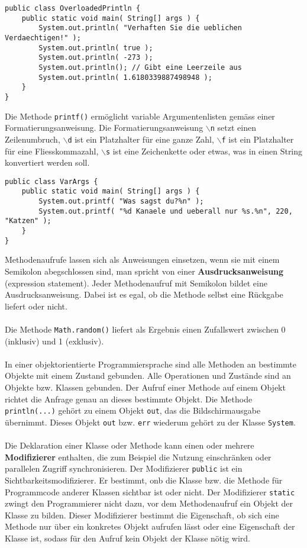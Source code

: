 \begin{lstlisting}
public class OverloadedPrintln {
    public static void main( String[] args ) {
        System.out.println( "Verhaften Sie die ueblichen Verdaechtigen!" );
        System.out.println( true );
        System.out.println( -273 );
        System.out.println(); // Gibt eine Leerzeile aus
        System.out.println( 1.6180339887498948 );
    }
}
\end{lstlisting}
Die Methode \texttt{printf()} ermöglicht variable Argumentenlisten gemäss einer Formatierungsanweisung. Die Formatierungsanweisung \texttt{$\backslash$n} setzt einen Zeilenumbruch, \texttt{$\backslash$d} ist ein Platzhalter für eine ganze Zahl, \texttt{$\backslash$f} ist ein Platzhalter für eine Fliesskommazahl, \texttt{$\backslash$s} ist eine Zeichenkette oder etwas, was in einen String konvertiert werden soll.
\begin{lstlisting}
public class VarArgs {
    public static void main( String[] args ) {
        System.out.printf( "Was sagst du?%n" );
        System.out.printf( "%d Kanaele und ueberall nur %s.%n", 220, "Katzen" );
    }
}
\end{lstlisting}
Methodenaufrufe lassen sich als Anweisungen einsetzen, wenn sie mit einem Semikolon abegschlossen sind, man spricht von einer \textbf{Ausdrucksanweisung} (expression statement). Jeder Methodenaufruf mit Semikolon bildet eine Ausdrucksanweisung. Dabei ist es egal, ob die Methode selbst eine Rückgabe liefert oder nicht.
\\\\
Die Methode \texttt{Math.random()} liefert als Ergebnis einen Zufallswert zwischen 0 (inklusiv) und 1 (exklusiv).
\\\\
In einer objektorientierte Programmiersprache sind alle Methoden an bestimmte Objekte mit einem Zustand gebunden. Alle Operationen und Zustände sind an Objekte bzw. Klassen gebunden. Der Aufruf einer Methode auf einem Objekt richtet die Anfrage genau an dieses bestimmte Objekt. Die Methode \texttt{println(...)} gehört zu einem Objekt \texttt{out}, das die Bildschirmausgabe übernimmt. Dieses Objekt \texttt{out} bzw. \texttt{err} wiederum gehört zu der Klasse \texttt{System}.
\\\\
Die Deklaration einer Klasse oder Methode kann einen oder mehrere \textbf{Modifizierer} enthalten, die zum Beispiel die Nutzung einschränken oder parallelen Zugriff synchronisieren. Der Modifizierer \texttt{public} ist ein Sichtbarkeitsmodifizierer. Er bestimmt, onb die Klasse bzw. die Methode für Programmcode anderer Klassen sichtbar ist oder nicht. Der Modifizierer \texttt{static} zwingt den Programmierer nicht dazu, vor dem Methodenaufruf ein Objekt der Klasse zu bilden. Dieser Modifizierer bestimmt die Eigenschaft, ob sich eine Methode nur über ein konkretes Objekt aufrufen lässt oder eine Eigenschaft der Klasse ist, sodass für den Aufruf kein Objekt der Klasse nötig wird.
